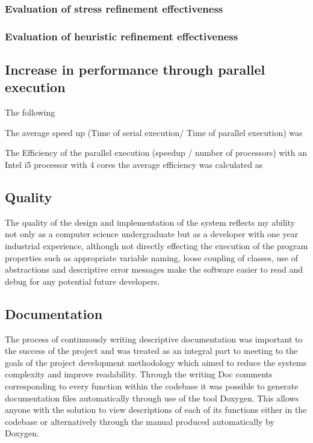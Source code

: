 

\subsubsection{Evaluation of stress refinement effectiveness}

\subsubsection{Evaluation of heuristic refinement effectiveness}



\subsection{Increase in performance through parallel execution}
The following 

The average speed up (Time of serial execution/ Time of parallel execution) was 


The Efficiency of the parallel execution (speedup / number of processors) with an Intel i5 processor with 4 cores the average efficiency  was calculated as

\subsection{Quality}
The quality of the design and implementation of the system reflects my ability not only as a computer science undergraduate but as a developer with one year industrial experience, although not directly effecting the execution of the program properties such as appropriate variable naming, loose coupling of classes, use of abstractions and descriptive error messages make the software easier to read and debug for any potential future developers.


\subsection{Documentation}
The process of continuously writing descriptive documentation was important to the success of the project and was treated as an integral part to meeting to the goals of the project development methodology which aimed to reduce the systems complexity and improve readability. Through the writing Doc comments corresponding to every function within the codebase it was possible to generate documentation files automatically through use of the tool Doxygen. This allows anyone with the solution to view descriptions of each of its functions either in the codebase or alternatively through the manual produced automatically by Doxygen.

